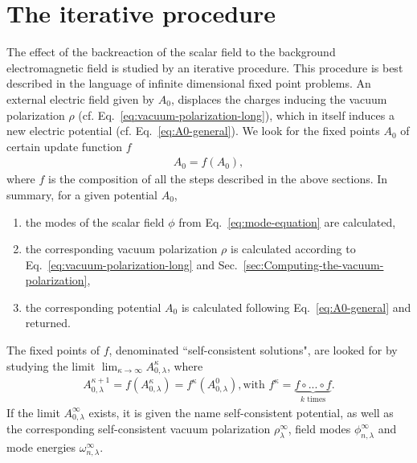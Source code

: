 \section{The iterative procedure}
\label{sec:The-iterative-procedure}

The effect of the backreaction of the scalar field to the background
electromagnetic field is studied by an iterative procedure. This procedure is
best described in the language of infinite dimensional fixed point problems. An external electric field given by $A_0$, displaces the charges inducing the vacuum polarization $\rho$ (cf. Eq.~\eqref{eq:vacuum-polarization-long}), which in itself induces a new electric potential (cf. Eq.~\eqref{eq:A0-general}). We look for the fixed points  $A_0$ of certain update function $f$
\begin{align}
    A_0 = f(A_0),
    \label{eq:fixed-point-problem}
\end{align}
where $f$ is the composition of all the steps described in the above sections. In summary, for a given potential $A_0$, 
\begin{enumerate}
    \item  the modes of the scalar field $\phi$ from Eq.~\eqref{eq:mode-equation} are calculated,
    \item  the corresponding vacuum polarization $\rho$ is calculated according to  Eq.~\eqref{eq:vacuum-polarization-long} and Sec.~\ref{sec:Computing-the-vacuum-polarization},
    \item  the corresponding potential $A_0$ is calculated following Eq.~\eqref{eq:A0-general} and returned. 
\end{enumerate}
The fixed points of $f$, denominated ``self-consistent solutions", are looked for by studying the limit $\lim_{\kappa\to \infty}A_{0,\lambda}^{\kappa}$, where 
\begin{align}
    A_{0,\lambda}^{\kappa + 1} = f(A_{0,\lambda}^{\kappa}) =
    f^{\kappa}\left(A_{0, \lambda}^{0} \right), \textrm{with } f^\kappa =
    \underbrace{f \circ ... \circ f}_{k \textrm{ times}}.
    \label{eq:self-consistent-limit}
\end{align}
If the limit $A_{0, \lambda}^{\infty}$ exists, it is given the name
self-consistent potential, as well as the corresponding self-consistent vacuum
polarization $\rho_{\lambda}^{\infty}$, field modes $\phi_{n,
\lambda}^{\infty}$ and mode energies $\omega_{n, \lambda}^{\infty}$.

